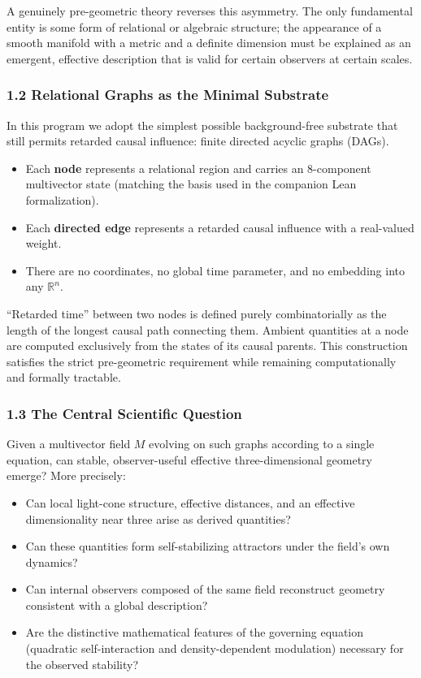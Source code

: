 \documentclass[
  11pt,
  a4paper,
]{article}
\providecommand{\tightlist}{%
  \setlength{\itemsep}{0pt}\setlength{\parskip}{0pt}}
\begin{document}
A genuinely pre-geometric theory reverses this asymmetry. The only
fundamental entity is some form of relational or algebraic structure;
the appearance of a smooth manifold with a metric and a definite
dimension must be explained as an emergent, effective description that
is valid for certain observers at certain scales.

\subsubsection{1.2 Relational Graphs as the Minimal
Substrate}\label{relational-graphs-as-the-minimal-substrate}

In this program we adopt the simplest possible background-free substrate
that still permits retarded causal influence: finite directed acyclic
graphs (DAGs).

\begin{itemize}
\tightlist
\item
  Each \textbf{node} represents a relational region and carries an
  8-component multivector state (matching the basis used in the
  companion Lean formalization).
\item
  Each \textbf{directed edge} represents a retarded causal influence
  with a real-valued weight.
\item
  There are no coordinates, no global time parameter, and no embedding
  into any \(\mathbb{R}^n\).
\end{itemize}

``Retarded time'' between two nodes is defined purely combinatorially as
the length of the longest causal path connecting them. Ambient
quantities at a node are computed exclusively from the states of its
causal parents. This construction satisfies the strict pre-geometric
requirement while remaining computationally and formally tractable.

\subsubsection{1.3 The Central Scientific
Question}\label{the-central-scientific-question}

Given a multivector field \(M\) evolving on such graphs according to a
single equation, can stable, observer-useful effective three-dimensional
geometry emerge? More precisely:

\begin{itemize}
\tightlist
\item
  Can local light-cone structure, effective distances, and an effective
  dimensionality near three arise as derived quantities?
\item
  Can these quantities form self-stabilizing attractors under the
  field's own dynamics?
\item
  Can internal observers composed of the same field reconstruct geometry
  consistent with a global description?
\item
  Are the distinctive mathematical features of the governing equation
  (quadratic self-interaction and density-dependent modulation)
  necessary for the observed stability?
\end{itemize}
\end{document}
